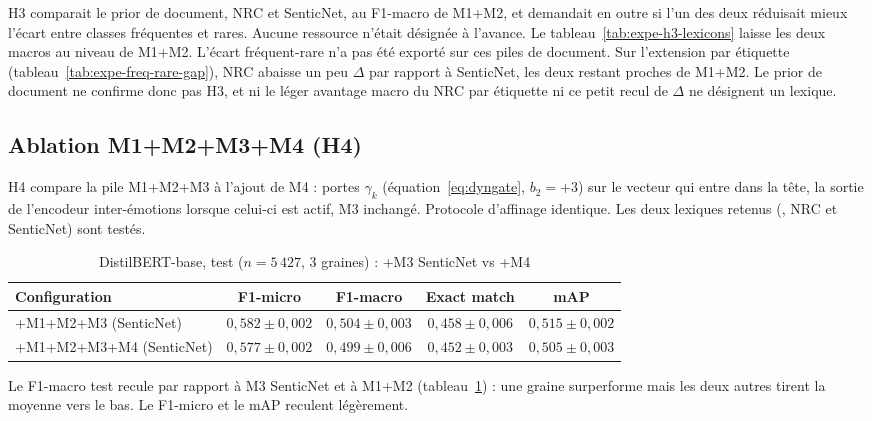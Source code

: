 H3 comparait le prior de document, NRC et SenticNet, au F1-macro de
M1+M2, et demandait en outre si l'un des deux réduisait mieux l'écart
entre classes fréquentes et rares. Aucune ressource n'était désignée à
l'avance. Le tableau~\ref{tab:expe-h3-lexicons} laisse les deux macros
au niveau de M1+M2. L'écart fréquent-rare n'a pas été exporté sur ces
piles de document. Sur l'extension par étiquette
(tableau~\ref{tab:expe-freq-rare-gap}), NRC abaisse un peu $\Delta$ par
rapport à SenticNet, les deux restant proches de M1+M2. Le prior de
document ne confirme donc pas H3, et ni le léger avantage macro du NRC
par étiquette ni ce petit recul de $\Delta$ ne désignent un lexique.

\subsection{Ablation M1+M2+M3+M4 (H4)}
\label{sec:expe-m4-h4}

H4 compare la pile M1+M2+M3 à l'ajout de M4 : portes
$\gamma_k$ (équation~\ref{eq:dyngate}, $b_2{=}+3$) sur le vecteur qui entre
dans la tête, la sortie de l'encodeur inter-émotions lorsque celui-ci est
actif, M3 inchangé. Protocole d'affinage identique.
Les deux lexiques retenus (, NRC et
SenticNet) sont testés.

\begin{table}[H]
\centering
\caption{DistilBERT-base, test ($n{=}5\,427$, 3 graines) : +M3 SenticNet vs +M4}
\label{tab:expe-m4-distilbert}
\renewcommand{\arraystretch}{1.2}
\setlength{\tabcolsep}{3.5pt}
\small
\begin{tabular}{|l|c|c|c|c|}
\hline
\textbf{Configuration} & \textbf{F1-micro} & \textbf{F1-macro} & \textbf{Exact match} & \textbf{mAP} \\
\hline
+M1+M2+M3 (SenticNet) & $0{,}582 \pm 0{,}002$ & $0{,}504 \pm 0{,}003$ & $0{,}458 \pm 0{,}006$ & $0{,}515 \pm 0{,}002$ \\
\hline
+M1+M2+M3+M4 (SenticNet) & $0{,}577 \pm 0{,}002$ & $0{,}499 \pm 0{,}006$ & $0{,}452 \pm 0{,}003$ & $0{,}505 \pm 0{,}003$ \\
\hline
\end{tabular}
\end{table}

Le F1-macro test recule par rapport à M3 SenticNet et à M1+M2
(tableau~\ref{tab:expe-m4-distilbert}) : une graine surperforme mais les
deux autres tirent la moyenne vers le bas. Le F1-micro et le mAP reculent
légèrement.

